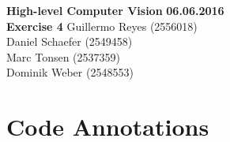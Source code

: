 \documentclass[12pt]{article}
\begin{document}

\noindent
{\Large \textbf{High-level Computer Vision}} \hfill \textbf{06.06.2016}\\
{\Large \textbf{Exercise 4}} 
\raggedleft \hfill Guillermo Reyes (2556018)\\
\hfill Daniel Schaefer (2549458)\\
\hfill Marc Tonsen (2537359)\\
\hfill Dominik Weber (2548553)\\

\raggedright


\section*{Code Annotations}
\end{document}
